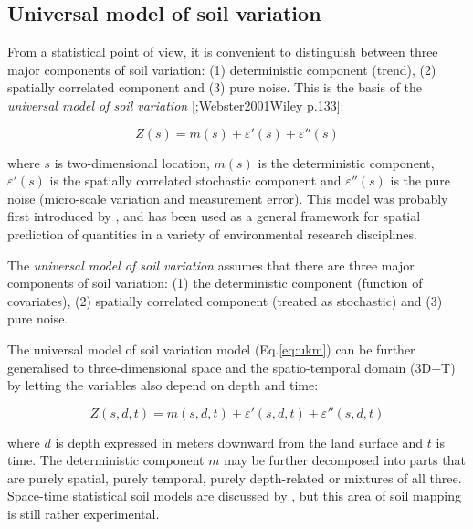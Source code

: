 \documentclass[graybox,natbib,nospthms,UStrade]{svmono}
\let\BeginKnitrBlock\begin \let\EndKnitrBlock\end
\let\BeginKnitrBlock\begin \let\EndKnitrBlock\end
\begin{document}
\hypertarget{umsv}{%
\subsection{Universal model of soil variation}\label{umsv}}

From a statistical point of view, it is convenient to distinguish
between three major components of soil variation: (1) deterministic
component (trend), (2) spatially correlated component and (3) pure
noise. This is the basis of the \emph{universal model of soil variation}
{[}\citet{Burrough1998OUP};Webster2001Wiley p.133{]}:

\begin{equation}
  Z({s}) = m({s}) + \varepsilon '({s}) + \varepsilon ''({s})
  \label{eq:ukm}
\end{equation}

where \(s\) is two-dimensional location, \(m({s})\) is the
deterministic component, \(\varepsilon '({s})\) is the spatially
correlated stochastic component and \(\varepsilon ''({s})\) is the
pure noise (micro-scale variation and measurement error). This model was
probably first introduced by \citet{Matheron1969PhD}, and has been used as a
general framework for spatial prediction of quantities in a variety of
environmental research disciplines.

\BeginKnitrBlock{rmdnote}
The \emph{universal model of soil variation} assumes that there are three
major components of soil variation: (1) the deterministic component
(function of covariates), (2) spatially correlated component (treated as
stochastic) and (3) pure noise.
\EndKnitrBlock{rmdnote}

The universal model of soil variation model (Eq.\eqref{eq:ukm}) can be
further generalised to three-dimensional space and the spatio-temporal
domain (3D+T) by letting the variables also depend on depth and time:

\begin{equation}
Z({s}, d, t) = m({s}, d, t) + \varepsilon '({s}, d, t) + \varepsilon ''({s}, d, t)
\label{eq:ukm3DT}
\end{equation}

where \(d\) is depth expressed in meters downward from the land surface
and \(t\) is time. The deterministic component \(m\) may be further
decomposed into parts that are purely spatial, purely temporal, purely
depth-related or mixtures of all three. Space-time statistical soil
models are discussed by \citet{Grunwald2005CRCPress}, but this area of soil
mapping is still rather experimental.
\end{document}
